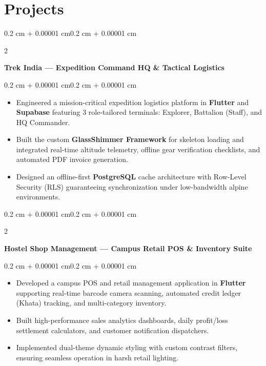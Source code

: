 \documentclass[10pt, a4paper]{article}
\newenvironment{highlights}{
    \begin{itemize}[
        topsep=0.06 cm,
        parsep=0.05 cm,
        partopsep=0pt,
        itemsep=0pt,
        leftmargin=0.4 cm + 10pt
    ]
}{
    \end{itemize}
}
\newenvironment{onecolentry}{
    \begin{adjustwidth}{0.2 cm + 0.00001 cm}{0.2 cm + 0.00001 cm}
}{
    \end{adjustwidth}
}
\newenvironment{twocolentry}[2][]{
    \onecolentry
    \def\secondColumn{#2}
    \setcolumnwidth{\fill, 4.5 cm}
    \begin{paracol}{2}
}{
    \switchcolumn \raggedleft \secondColumn
    \end{paracol}
    \endonecolentry
}
\let\hrefWithoutArrow\href
\renewcommand{\href}[2]{\hrefWithoutArrow{#1}{\ifthenelse{\equal{#2}{}}{ }{#2 }\raisebox{.15ex}{\footnotesize \faExternalLink*}}}
\begin{document}
\section{Projects}
\begin{twocolentry}{\textit{\href{https://github.com/I-am-Manu-Singh/TrekIndiaApp}{\underline{Repo}}}}
    \textbf{Trek India — Expedition Command HQ \& Tactical Logistics}
\end{twocolentry}
\vspace{0.06 cm}
\begin{onecolentry}
    \begin{highlights}
    \item Engineered a mission-critical expedition logistics platform in \textbf{Flutter} and \textbf{Supabase} featuring 3 role-tailored terminals: Explorer, Battalion (Staff), and HQ Commander.
    \item Built the custom \textbf{GlassShimmer Framework} for skeleton loading and integrated real-time altitude telemetry, offline gear verification checklists, and automated PDF invoice generation.
    \item Designed an offline-first \textbf{PostgreSQL} cache architecture with Row-Level Security (RLS) guaranteeing synchronization under low-bandwidth alpine environments.
    \end{highlights}
\end{onecolentry}
\vspace{0.14 cm}

\begin{twocolentry}{\textit{\href{https://github.com/I-am-Manu-Singh/HostelShopManagementApp}{\underline{Repo}}}}
    \textbf{Hostel Shop Management — Campus Retail POS \& Inventory Suite}
\end{twocolentry}
\vspace{0.06 cm}
\begin{onecolentry}
    \begin{highlights}
    \item Developed a campus POS and retail management application in \textbf{Flutter} supporting real-time barcode camera scanning, automated credit ledger (Khata) tracking, and multi-category inventory.
    \item Built high-performance sales analytics dashboards, daily profit/loss settlement calculators, and customer notification dispatchers.
    \item Implemented dual-theme dynamic styling with custom contrast filters, ensuring seamless operation in harsh retail lighting.
    \end{highlights}
\end{onecolentry}
\vspace{0.14 cm}
\end{document}
